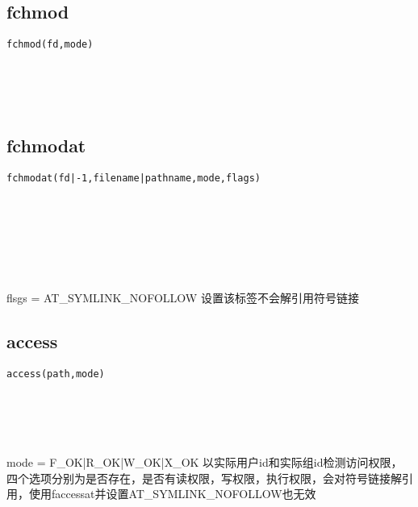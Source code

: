 \documentclass[10pt,a4paper]{article}
\begin{document}
\subsection{fchmod}
\begin{spacing}{2.0}
\lstset{language=C,numbers=none}
\begin{lstlisting}
fchmod(fd,mode)
\end{lstlisting}
{\large\color[rgb]{0.2,0.4,0.6}{fd:}} \\
{\large\color[rgb]{0.2,0.4,0.6}{mode:}}
\paragraph{ \ \ }
\end{spacing}

\subsection{fchmodat}
\begin{spacing}{2.0}
\lstset{language=C,numbers=none}
\begin{lstlisting}
fchmodat(fd|-1,filename|pathname,mode,flags)
\end{lstlisting}
{\large\color[rgb]{0.2,0.4,0.6}{fd|-1:}} \\
{\large\color[rgb]{0.2,0.4,0.6}{filename|pathname:}} \\
{\large\color[rgb]{0.2,0.4,0.6}{mode:}} \\
{\large\color[rgb]{0.2,0.4,0.6}{flags:}}
\paragraph{ \ \ }flsgs = AT\_SYMLINK\_NOFOLLOW 设置该标签不会解引用符号链接
\end{spacing}

\subsection{access}
\begin{spacing}{2.0}
\lstset{language=C,numbers=none}
\begin{lstlisting}
access(path,mode)
\end{lstlisting}
{\large\color[rgb]{0.2,0.4,0.6}{path:}} \\
{\large\color[rgb]{0.2,0.4,0.6}{mode:}}
\paragraph{ \ \ }mode = F\_OK|R\_OK|W\_OK|X\_OK 以实际用户id和实际组id检测访问权限，四个选项分别为是否存在，是否有读权限，写权限，执行权限，会对符号链接解引用，使用faccessat并设置AT\_SYMLINK\_NOFOLLOW也无效
\end{spacing}
\end{document}

